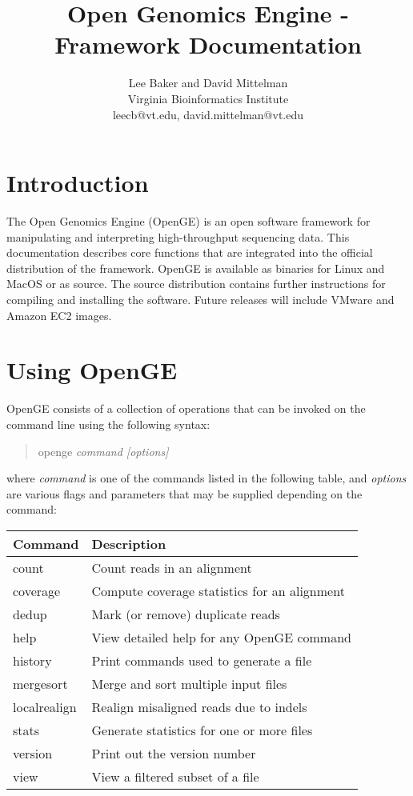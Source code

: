 \documentclass[11pt]{article}
\newcommand {\cmd}[1] {\begin{quote}#1\end{quote}}
\begin{document}
\title{Open Genomics Engine - Framework Documentation}
\author{Lee Baker and David Mittelman\\
Virginia Bioinformatics Institute \\
leecb@vt.edu, david.mittelman@vt.edu}
\maketitle

\section {Introduction}
The Open Genomics Engine (OpenGE) is an open software framework for manipulating and interpreting high-throughput sequencing data. This documentation describes core functions that are integrated into the official distribution of the framework. OpenGE is available as binaries for Linux and MacOS or as source. The source distribution contains further instructions for compiling and installing the software. Future releases will include VMware and Amazon EC2 images.
\section {Using OpenGE}
OpenGE consists of a collection of operations that can be invoked on the command line using the following syntax:

\cmd{openge \textit{command [options]}}

where \textit{command} is one of the commands listed in the following table, and \textit{options} are various flags and parameters that may be supplied depending on the command:

\begin{center}
\begin{tabular}{lp{3.5in}}
\hline
Command&Description\\ \hline
count&Count reads in an alignment\\
coverage&Compute coverage statistics for an alignment\\
dedup&Mark (or remove) duplicate reads\\
help&View detailed help for any OpenGE command\\
history&Print commands used to generate a file\\
mergesort&Merge and sort multiple input files\\
localrealign&Realign misaligned reads due to indels\\
stats&Generate statistics for one or more files\\
version&Print out the version number\\
view&View a filtered subset of a file\\
\end{tabular}
\end{center}
\end{document}
